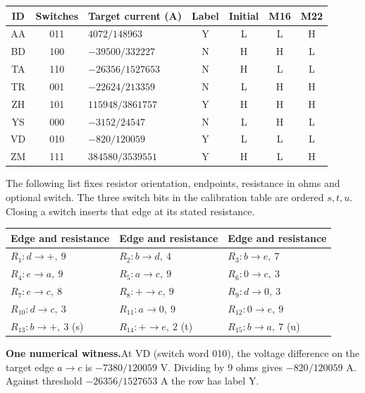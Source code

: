\documentclass[12pt,letterpaper]{article}
\newcommand{\reading}[2]{\par\smallskip\textsf{\color{accent}\bfseries #1}\enspace #2\par}
\begin{document}
\begin{center}{\small\setlength{\tabcolsep}{4pt}\begin{tabularx}{\linewidth}{@{}ccYcccc@{}}\toprule
ID & Switches & Target current (A) & Label & Initial & M16 & M22\\ \midrule
AA & 011 & $4072/148963$ & Y & L & L & H\\
BD & 100 & $-39500/332227$ & N & H & H & L\\
TA & 110 & $-26356/1527653$ & N & H & L & L\\
TR & 001 & $-22624/213359$ & N & L & H & H\\
ZH & 101 & $115948/3861757$ & Y & H & H & H\\
YS & 000 & $-3152/24547$ & N & L & H & L\\
VD & 010 & $-820/120059$ & Y & L & L & L\\
ZM & 111 & $384580/3539551$ & Y & H & L & H\\\bottomrule\end{tabularx}}\end{center}

The following list fixes resistor orientation, endpoints, resistance in ohms and optional switch. The three switch bits in the calibration table are ordered $s,t,u$. Closing a switch inserts that edge at its stated resistance.

\begin{center}{\footnotesize\setlength{\tabcolsep}{4pt}\begin{tabularx}{\linewidth}{@{}YYY@{}}\toprule
Edge and resistance & Edge and resistance & Edge and resistance\\ \midrule
$R_{1}\colon d\!\to\!+,\ 9$ & $R_{2}\colon b\!\to\!d,\ 4$ & $R_{3}\colon b\!\to\!e,\ 7$\\
$R_{4}\colon e\!\to\!a,\ 9$ & $R_{5}\colon a\!\to\!c,\ 9$ & $R_{6}\colon 0\!\to\!c,\ 3$\\
$R_{7}\colon e\!\to\!c,\ 8$ & $R_{8}\colon +\!\to\!c,\ 9$ & $R_{9}\colon d\!\to\!0,\ 3$\\
$R_{10}\colon d\!\to\!c,\ 3$ & $R_{11}\colon a\!\to\!0,\ 9$ & $R_{12}\colon 0\!\to\!e,\ 9$\\
$R_{13}\colon b\!\to\!+,\ 3$ (s) & $R_{14}\colon +\!\to\!e,\ 2$ (t) & $R_{15}\colon b\!\to\!a,\ 7$ (u)\\\bottomrule\end{tabularx}}\end{center}

\reading{One numerical witness.}{At VD (switch word 010), the voltage difference on the target edge $a\to c$ is $-7380/120059$ V. Dividing by 9 ohms gives $-820/120059$ A. Against threshold $-26356/1527653$ A the row has label Y.}
\end{document}

